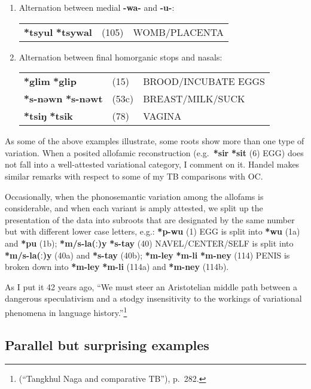 \begin{enumerate}
\item %
Alternation between medial \textbf{-wa-} and \textbf{-u-}:

\begin{tabular}{lll}
\textbf{*tsyul} \STEDTU{⪤} \textbf{*tsywal} &(105)	&WOMB/PLACENTA\\
\end{tabular}

\item \label{itm:hom-var} %
Alternation between final homorganic stops and nasals:\nopagebreak[4]

\begin{tabular}{lll}
\textbf{*glim} \STEDTU{⪤} \textbf{*glip} 	&(15)	&BROOD/INCUBATE EGGS\\
\textbf{*s-nəwn} \STEDTU{⪤} \textbf{*s-nəwt} &(53c)	&BREAST/MILK/SUCK\\
\textbf{*tsiŋ} \STEDTU{⪤} \textbf{*tsik} &(78)	 	&VAGINA\\
\end{tabular}
\end{enumerate}


As some of the above examples illustrate, some roots show more than one type
of variation. When a posited allofamic reconstruction (e.g.\ \textbf{*sir}  \textbf{*sit} (6)
EGG) does not fall into a well-attested variational category, I comment on it. 
Handel makes similar remarks with respect to some of my TB comparisons with OC.


Occasionally, when the phonosemantic variation among the allofams is
considerable, and when each variant is amply attested, we split up the
presentation of the data into subroots that are designated by the same number
but with different lower case letters, e.g.: \textbf{*p-wu} (1) EGG is split into \textbf{*wu}
(1a) and \textbf{*pu} (1b);
\textbf{*m/s-la(ː)y}  \textbf{*s-tay} (40) NAVEL/CENTER/SELF is split into
\textbf{*m/s-la(ː)y} (40a) and \textbf{*s-tay} (40b);
\textbf{*m-ley}  \textbf{*m-li}  \textbf{*m-ney} (114) PENIS is
broken down into \textbf{*m-ley}  \textbf{*m-li} (114a)
and \textbf{*m-ney} (114b).


As I put it 42 years ago, “We must steer an Aristotelian middle path between
a dangerous speculativism and a stodgy insensitivity to the workings of
variational phenomena in language history.”\footnote{\citealt{JAM-TNTB} (“Tangkhul
Naga and comparative TB”), p.~282.}

\subsection{Parallel but surprising examples}

